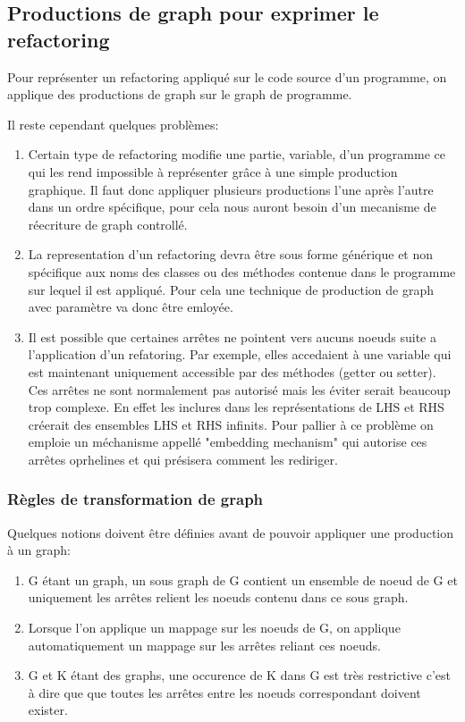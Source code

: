 \documentclass[a4paper, 12pt]{article}
\begin{document}
\subsection{Productions de graph pour exprimer le refactoring}

Pour représenter un refactoring appliqué sur le code source d'un programme, on applique des productions de graph sur le graph de programme.

Il reste cependant quelques problèmes:

\begin{enumerate}
\item Certain type de refactoring modifie une partie, variable, d'un programme ce qui les rend impossible à représenter grâce à une simple production graphique. Il faut donc appliquer plusieurs productions l'une après l'autre dans un ordre spécifique, pour cela nous auront besoin d'un mecanisme de réecriture de graph controllé.

\item La representation d'un refactoring devra être sous forme générique et non spécifique aux noms des classes ou des méthodes contenue dans le programme sur lequel il est appliqué. Pour cela une technique de production de graph avec paramètre va donc être emloyée. 

\item Il est possible que certaines arrêtes ne pointent vers aucuns noeuds suite a l'application d'un refatoring. Par exemple, elles accedaient à une variable qui est maintenant uniquement accessible par des méthodes (getter ou setter). Ces arrêtes ne sont normalement pas autorisé mais les éviter serait beaucoup trop complexe. En effet les inclures dans les représentations de LHS et RHS créerait des ensembles LHS et RHS infinits. Pour pallier à ce problème on emploie un méchanisme appellé "embedding mechanism" qui autorise ces arrêtes oprhelines et qui présisera comment les rediriger.
\end{enumerate}

\subsubsection{Règles de transformation de graph}

Quelques notions doivent être définies avant de pouvoir appliquer une production à un graph:

\begin{enumerate}
\item G étant un graph, un sous graph de G contient un ensemble de noeud de G et uniquement les arrêtes relient les noeuds contenu dans ce sous graph. 

\item Lorsque l'on applique un mappage sur les noeuds de G, on applique automatiquement un mappage sur les arrêtes reliant ces noeuds.

\item G et K étant des graphs, une occurence de K dans G est très restrictive c'est à dire que que toutes les arrêtes entre les noeuds correspondant doivent exister. 
\end{enumerate}
\end{document}
